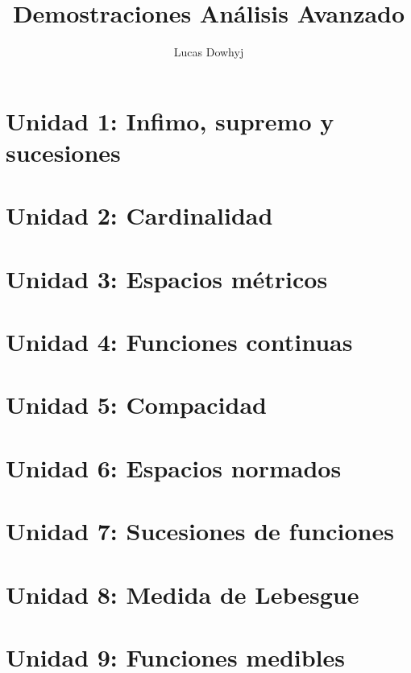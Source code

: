 \documentclass[11pt,a4paper]{article}
\theoremstyle{plain}
\theoremstyle{definition}
\theoremstyle{remark}
\begin{document}
\title{Demostraciones Análisis Avanzado}
\author{Lucas Dowhyj}
\date{}
\maketitle

\tableofcontents
\clearpage

\section{Unidad 1: Infimo, supremo y sucesiones}

\clearpage
\section{Unidad 2: Cardinalidad}

\clearpage
\section{Unidad 3: Espacios métricos}

\clearpage
\section{Unidad 4: Funciones continuas}

\clearpage
\section{Unidad 5: Compacidad}

\clearpage
\section{Unidad 6: Espacios normados}

\clearpage
\section{Unidad 7: Sucesiones de funciones}

\clearpage
\section{Unidad 8: Medida de Lebesgue}

\clearpage
\section{Unidad 9: Funciones medibles}

\end{document}
